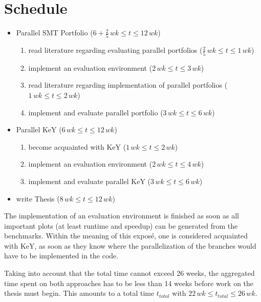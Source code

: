 \documentclass{scrartcl}
\begin{document}
\section{Schedule}
\begin{itemize}
    \item Parallel SMT Portfolio (\(6 + \frac{2}{5}\, wk \le t \le 12\, wk\))
    \begin{enumerate}
        \item read literature regarding evaluating parallel portfolios
            (\(\frac{2}{5}\, wk \le t \le 1\, wk\))
        \item implement an evaluation environment
            (\(2\, wk \le t \le 3\, wk\))
        \item read literature regarding implementation of parallel portfolios
            (\(1\, wk \le t \le 2\, wk\))
        \item implement and evaluate parallel portfolio
            (\(3\, wk \le t \le 6\, wk\))
    \end{enumerate}
    \item Parallel KeY (\(6\, wk \le t \le 12\, wk\))
    \begin{enumerate}
        \item become acquainted with KeY
            (\(1\, wk \le t \le 2\, wk\))
        \item implement an evaluation environment
            (\(2\, wk \le t \le 4\, wk\))
        \item implement and evaluate parallel KeY
            (\(3\, wk \le t \le 6\, wk\))
    \end{enumerate}
    \item write Thesis (\(8\, wk \le t \le 12\, wk\))
\end{itemize}
The implementation of an evaluation environment is finished as soon as
all important plots (at least runtime and speedup) can be generated from the benchmarks.
Within the meaning of this exposé, one is considered acquainted with KeY,
as soon as they know where the parallelization of the branches would have to be
implemented in the code.

Taking into account that the total time cannot exceed 26 weeks,
the aggregated time spent on both approaches has to be less than 14 weeks
before work on the thesis must begin.
This amounts to a total time \(t_{total}\) with \(22\, wk \le t_{total} \le 26\, wk\).
\printbibliography
\end{document}
